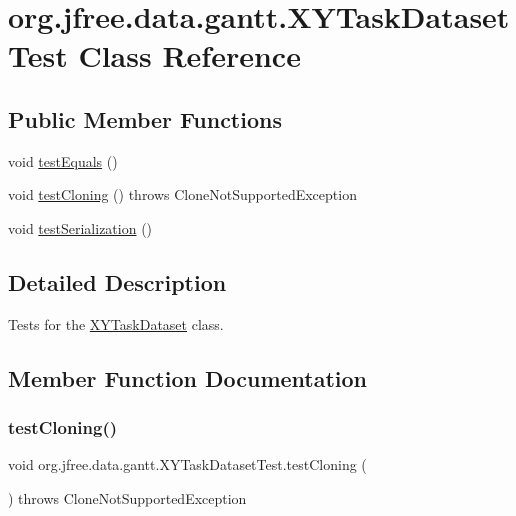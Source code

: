 \hypertarget{classorg_1_1jfree_1_1data_1_1gantt_1_1_x_y_task_dataset_test}{}\section{org.\+jfree.\+data.\+gantt.\+X\+Y\+Task\+Dataset\+Test Class Reference}
\label{classorg_1_1jfree_1_1data_1_1gantt_1_1_x_y_task_dataset_test}
\subsection*{Public Member Functions}
\begin{DoxyCompactItemize}
\item 
void \mbox{\hyperlink{classorg_1_1jfree_1_1data_1_1gantt_1_1_x_y_task_dataset_test_a04429c5fe217c21ac742726356488d0e}{test\+Equals}} ()
\item 
void \mbox{\hyperlink{classorg_1_1jfree_1_1data_1_1gantt_1_1_x_y_task_dataset_test_a02f11a8daa3e44e0fdaea459b41439fb}{test\+Cloning}} ()  throws Clone\+Not\+Supported\+Exception 
\item 
void \mbox{\hyperlink{classorg_1_1jfree_1_1data_1_1gantt_1_1_x_y_task_dataset_test_a8b7e05fce20f50c10d6f7e73b767094b}{test\+Serialization}} ()
\end{DoxyCompactItemize}


\subsection{Detailed Description}
Tests for the \mbox{\hyperlink{classorg_1_1jfree_1_1data_1_1gantt_1_1_x_y_task_dataset}{X\+Y\+Task\+Dataset}} class. 

\subsection{Member Function Documentation}
\mbox{\label{classorg_1_1jfree_1_1data_1_1gantt_1_1_x_y_task_dataset_test_a02f11a8daa3e44e0fdaea459b41439fb}} 
\subsubsection{\texorpdfstring{test\+Cloning()}{testCloning()}}
{\footnotesize\ttfamily void org.\+jfree.\+data.\+gantt.\+X\+Y\+Task\+Dataset\+Test.\+test\+Cloning (\begin{DoxyParamCaption}{ }\end{DoxyParamCaption}) throws Clone\+Not\+Supported\+Exception}

